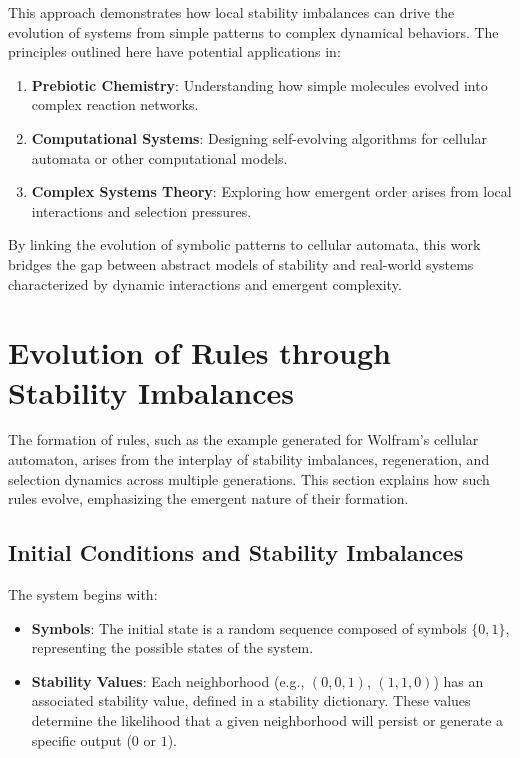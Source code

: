 \documentclass[entropy,article,submit,pdftex,moreauthors]{Definitions/mdpi}
\begin{document}
This approach demonstrates how local stability imbalances can drive the evolution of systems from simple patterns to complex dynamical behaviors. The principles outlined here have potential applications in:
\begin{enumerate}
    \item \textbf{Prebiotic Chemistry}: Understanding how simple molecules evolved into complex reaction networks.
    \item \textbf{Computational Systems}: Designing self-evolving algorithms for cellular automata or other computational models.
    \item \textbf{Complex Systems Theory}: Exploring how emergent order arises from local interactions and selection pressures.
\end{enumerate}

By linking the evolution of symbolic patterns to cellular automata, this work bridges the gap between abstract models of stability and real-world systems characterized by dynamic interactions and emergent complexity.

\section{Evolution of Rules through Stability Imbalances}

The formation of rules, such as the example generated for Wolfram’s cellular automaton, arises from the interplay of stability imbalances, regeneration, and selection dynamics across multiple generations. This section explains how such rules evolve, emphasizing the emergent nature of their formation.

\subsection{Initial Conditions and Stability Imbalances}

The system begins with:
\begin{itemize}
    \item \textbf{Symbols}: The initial state is a random sequence composed of symbols \( \{0, 1\} \), representing the possible states of the system.
    \item \textbf{Stability Values}: Each neighborhood (e.g., \((0, 0, 1)\), \((1, 1, 0)\)) has an associated stability value, defined in a stability dictionary. These values determine the likelihood that a given neighborhood will persist or generate a specific output (\(0\) or \(1\)).
\end{itemize}
\end{document}
